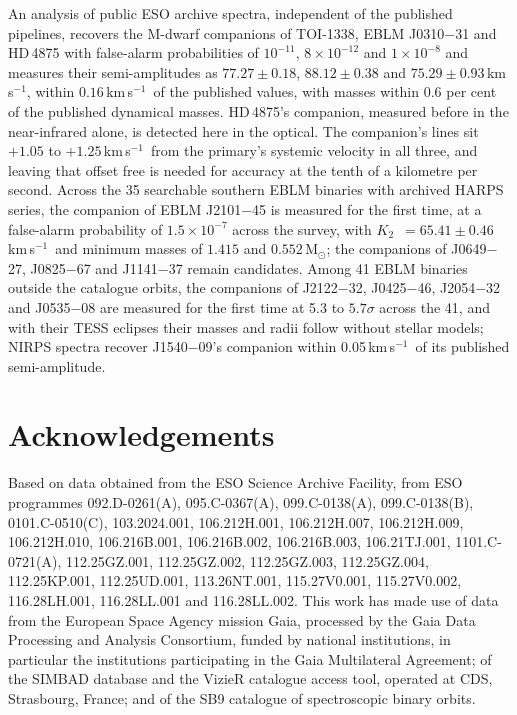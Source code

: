 \documentclass[3p,11pt]{elsarticle}
\newcommand{\kms}{km\,s$^{-1}$}
\newcommand{\Msun}{M$_\odot$}
\newcommand{\Ktwo}{$K_2$}
\begin{document}
An analysis of public ESO archive spectra, independent of the published pipelines, recovers the
M-dwarf companions of TOI-1338, EBLM J0310$-$31 and HD\,4875 with false-alarm probabilities of
$10^{-11}$, $8\times10^{-12}$ and $1\times10^{-8}$ and measures their semi-amplitudes as $77.27 \pm
0.18$, $88.12 \pm 0.38$ and $75.29 \pm 0.93$\,\kms, within $0.16$\,\kms\ of the published values,
with masses within 0.6 per cent of the published dynamical masses. HD\,4875's companion, measured
before in the near-infrared alone, is detected here in the optical. The companion's lines sit
$+1.05$ to $+1.25$\,\kms\ from the primary's systemic velocity in all three, and leaving that offset
free is needed for accuracy at the tenth of a kilometre per second. Across the 35 searchable
southern EBLM binaries with archived HARPS series, the companion of EBLM J2101$-$45 is measured for
the first time, at a false-alarm probability of $1.5\times10^{-7}$ across the survey, with \Ktwo\
$= 65.41 \pm 0.46$\,\kms\ and minimum masses of $1.415$ and $0.552$\,\Msun; the companions of
J0649$-$27, J0825$-$67 and J1141$-$37 remain candidates. Among 41 EBLM binaries outside the
catalogue orbits, the companions of J2122$-$32, J0425$-$46, J2054$-$32 and J0535$-$08 are measured
for the first time at 5.3 to $5.7\sigma$ across the 41, and with their TESS eclipses their masses
and radii follow without stellar models; NIRPS spectra recover J1540$-$09's companion within
0.05\,\kms\ of its published semi-amplitude.

\section*{Acknowledgements}

Based on data obtained from the ESO Science Archive Facility, from ESO programmes
092.D-0261(A), 095.C-0367(A), 099.C-0138(A), 099.C-0138(B), 0101.C-0510(C), 103.2024.001,
106.212H.001, 106.212H.007, 106.212H.009, 106.212H.010, 106.216B.001, 106.216B.002, 106.216B.003,
106.21TJ.001, 1101.C-0721(A), 112.25GZ.001, 112.25GZ.002, 112.25GZ.003, 112.25GZ.004,
112.25KP.001, 112.25UD.001, 113.26NT.001, 115.27V0.001, 115.27V0.002, 116.28LH.001, 116.28LL.001
and 116.28LL.002.
This work has made use of data from the European Space Agency mission Gaia, processed by the Gaia
Data Processing and Analysis Consortium, funded by national institutions, in particular the
institutions participating in the Gaia Multilateral Agreement; of the SIMBAD database and the
VizieR catalogue access tool, operated at CDS, Strasbourg, France; and of the SB9 catalogue of
spectroscopic binary orbits.
\end{document}
